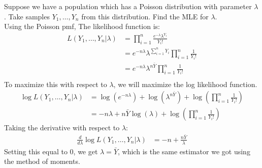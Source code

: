 \documentclass[notes.tex]{subfiles}
\begin{document}
\begin{example}Suppose we have a population which has a Poisson distribution with parameter $\lambda$. Take samples $Y_1, \dots, Y_n$ from this distribution. Find the MLE for $\lambda$.\\

Using the Poisson pmf, The likelihood function is:
\begin{align*}
L(Y_1, \dots, Y_n | \lambda) &= \prod_{i=1}^n \frac{e^{-\lambda} \lambda^{Y_i}}{Y_i!} \\
&= e^{-n \lambda} \lambda^{\sum_{i=1}^n Y_i} \prod_{i=1}^n \frac{1}{Y_i!} \\
&= e^{-n \lambda} \lambda^{n \bar{Y}} \prod_{i=1}^n \frac{1}{Y_i!} \\
\end{align*}
To maximize this with respect to $\lambda$, we will maximize the log likelihood function.
\begin{align*}
\log L(Y_1, \dots, Y_n | \lambda) &= \log(e^{-n \lambda}) + \log(\lambda^{n \bar{Y}} ) + \log \left( \prod_{i=1}^n \frac{1}{Y_i!}  \right)\\
&= -n \lambda + n \bar{Y} \log(\lambda) + \log \left( \prod_{i=1}^n \frac{1}{Y_i!} \right)
\end{align*}
Taking the derivative with respect to $\lambda$:
\begin{align*}
\frac{d}{d \lambda} \log L(Y_1, \dots, Y_n | \lambda) &= -n + \frac{ n \bar{Y} }{\lambda}
\end{align*}
Setting this equal to 0, we get $\lambda = \bar{Y}$, which is the same estimator we got using the method of moments.
\end{example}
\end{document}
